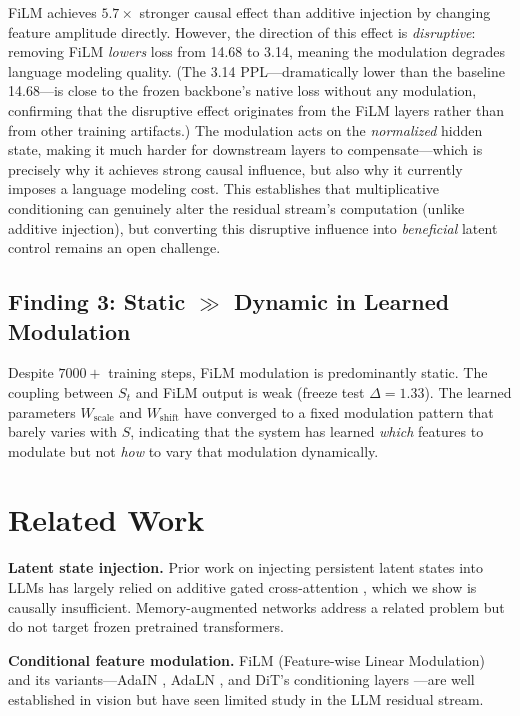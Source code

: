 \documentclass[11pt,a4paper]{article}
\newcommand{\St}{S_t}
\begin{document}
FiLM achieves $5.7\times$ stronger causal effect than additive injection by changing
feature amplitude directly. However, the direction of this effect is
\emph{disruptive}: removing FiLM \emph{lowers} loss from 14.68 to 3.14, meaning the
modulation degrades language modeling quality. (The 3.14 PPL---dramatically lower than the baseline 14.68---is close to the frozen backbone's native loss without any modulation, confirming that the disruptive effect originates from the FiLM layers rather than from other training artifacts.) The modulation acts on the
\emph{normalized} hidden state, making it much harder for downstream layers to
compensate---which is precisely why it achieves strong causal influence, but also why
it currently imposes a language modeling cost. This establishes that multiplicative
conditioning can genuinely alter the residual stream's computation (unlike additive
injection), but converting this disruptive influence into \emph{beneficial} latent
control remains an open challenge.

\subsection{Finding 3: Static $\gg$ Dynamic in Learned Modulation}

Despite $7000+$ training steps, FiLM modulation is predominantly static. The
coupling between $\St$ and FiLM output is weak (freeze test $\Delta = 1.33$). The
learned parameters $W_{\mathrm{scale}}$ and $W_{\mathrm{shift}}$ have converged to a
fixed modulation pattern that barely varies with $S$, indicating that the system has
learned \emph{which} features to modulate but not \emph{how} to vary that modulation
dynamically.

\section{Related Work}

\textbf{Latent state injection.} Prior work on injecting persistent latent states
into LLMs has largely relied on additive gated cross-attention
\cite{sukhbaatar2019augmenting, wu2022memorizing}, which we show is causally
insufficient. Memory-augmented networks \cite{graves2016hybrid} address a related
problem but do not target frozen pretrained transformers.

\textbf{Conditional feature modulation.} FiLM (Feature-wise Linear Modulation)
\cite{perez2018film} and its variants---AdaIN \cite{huang2017arbitrary}, AdaLN
\cite{ba2016layer}, and DiT's conditioning layers \cite{peebles2023scalable}---are
well established in vision but have seen limited study in the LLM residual stream.
\end{document}
